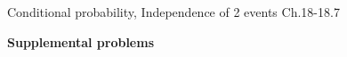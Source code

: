 \documentclass[handout]{mcs}
\begin{document}
\begin{staffnotes}
Conditional probability, Independence of 2 events Ch.18-18.7
\end{staffnotes}





\begin{center}
\textbf{\large Supplemental problems}
\end{center}





\end{document}
